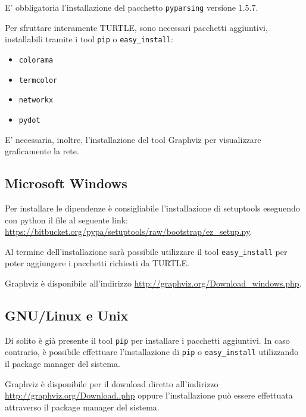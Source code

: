 
E' obbligatoria l'installazione del pacchetto \verb!pyparsing! versione 1.5.7.

Per sfruttare interamente TURTLE, sono necessari pacchetti aggiuntivi, installabili tramite i tool \verb!pip! o \verb!easy_install!:

\begin{itemize}
\item \verb!colorama! 
\item \verb!termcolor!
\item \verb!networkx!
\item \verb!pydot!
\end{itemize}

E' necessaria, inoltre, l'installazione del tool Graphviz per visualizzare graficamente la rete.

\subsection*{Microsoft Windows\textregistered}

Per installare le dipendenze è consigliabile l'installazione di setuptools eseguendo con python il file al seguente link: \url{https://bitbucket.org/pypa/setuptools/raw/bootstrap/ez_setup.py}.

Al termine dell'installazione sarà possibile utilizzare il tool \verb!easy_install! per poter aggiungere i pacchetti richiesti da TURTLE.

Graphviz è disponibile all'indirizzo \url{http://graphviz.org/Download_windows.php}.


\subsection*{GNU/Linux e Unix\textregistered}

Di solito è già presente il tool \verb!pip! per installare i pacchetti aggiuntivi. In caso contrario, è possibile effettuare l'installazione di \verb!pip! o \verb!easy_install! utilizzando il package manager del sistema.

Graphviz è disponibile per il download diretto all'indirizzo \url{http://graphviz.org/Download..php} oppure l'installazione può essere effettuata attraverso il package manager del sistema.